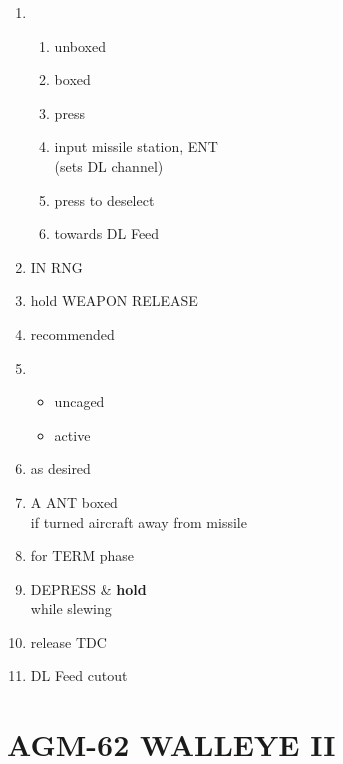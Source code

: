 \documentclass[fontInter, widesubsec]{TechCheck}
\begin{document}
	\begin{enumerate}[resume]
		\item {}
		\begin{enumerate}
			\item {}\dotfill unboxed
			\item {}\dotfill boxed
			\item {}\dotfill press
			\item {}\dotfill input missile station, ENT\\
			\hfill (sets DL channel)
			\item {}\dotfill press to deselect
			\item {}\dotfill towards DL Feed
		\end{enumerate}
		\item {}\dotfill IN RNG
		\item {}\dotfill hold WEAPON RELEASE
		\item {}\dotfill recommended
		\item {}
		\begin{itemize}
			\item {} uncaged
			\item {} active
		\end{itemize}
		\item {}\dotfill as desired
		\item {}\dotfill A ANT boxed\\
		\hfill if turned aircraft away from missile
		\item {}\dotfill for TERM phase
		\item {}\dotfill DEPRESS \& \textbf{hold}\\
		\hfill while slewing
		\item {}\dotfill release TDC
		\item {}\dotfill DL Feed cutout
	\end{enumerate}

	\section{AGM-62 WALLEYE II}
\end{document}
